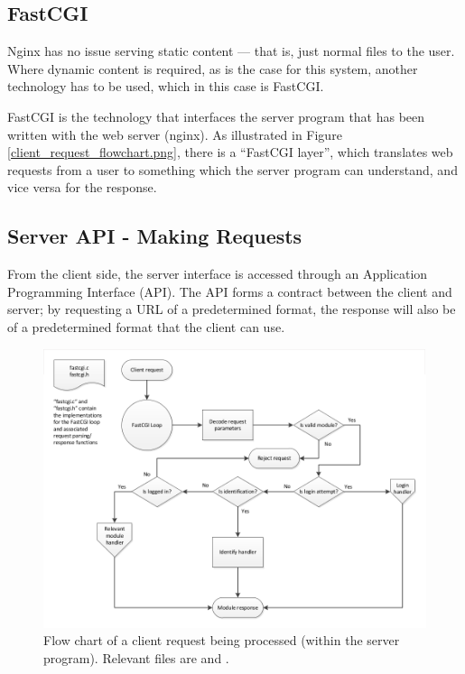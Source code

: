 \subsection{FastCGI}

Nginx has no issue serving static content --- that is, just normal files to the user. Where dynamic content is required, as is the case for this system, another technology has to be used, which in this case is FastCGI.

FastCGI is the technology that interfaces the server program that has been written with the web server (nginx). As illustrated in Figure \ref{client_request_flowchart.png}, there is a ``FastCGI layer'', which translates web requests from a user to something which the server program can understand, and vice versa for the response. 

\subsection{Server API - Making Requests}\label{API}

From the client side, the server interface is accessed through an Application Programming Interface (API). The API forms a contract between the client and server; by requesting a URL of a predetermined format, the response will also be of a predetermined format that the client can use.

\begin{figure}[H]
	\centering
	\includegraphics[width=1.1\textwidth]{figures/fastcgi-flow-chart.png}
	\caption{Flow chart of a client request being processed (within the server program). Relevant files are  and .} 
	\label{fastcgi-flow-chart.png}
\end{figure}

